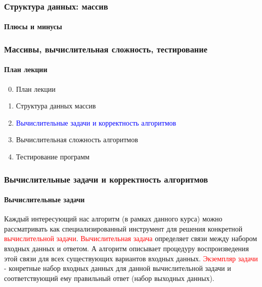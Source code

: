 \documentclass[aspectratio=169]{beamer}
\begin{document}
\begin{frame}
\frametitle{Структура данных: массив}
\framesubtitle{Плюсы и минусы}
\justifying
\small

\begin{figure}
    \captionsetup[subfigure]{labelformat=empty}
    \centering
\end{figure}
\end{frame}

\begin{frame}
\frametitle{Массивы, вычислительная сложность, тестирование}
\framesubtitle{План лекции}

\begin{enumerate}
  \setcounter{enumi}{-1}
  \item{План лекции}
  \item{Структура данных массив}
  \item{\textcolor{blue}{Вычислительные задачи и корректность алгоритмов}}
  \item{Вычислительная сложность алгоритмов}
  \item{Тестирование программ}
\end{enumerate}
\end{frame}

\begin{frame}
\frametitle{Вычислительные задачи и корректность алгоритмов}
\framesubtitle{Вычислительные задачи}
\justifying

Каждый интересующий нас алгоритм (в рамках данного курса) можно рассматривать как специализированный инструмент для решения конкретной \textcolor{red}{вычислительной задачи}.\newline\newline
\textcolor{red}{Вычислительная задача} определяет связи между набором входных данных и ответом. А алгоритм описывает процедуру воспроизведения этой связи для всех существующих вариантов входных данных.\newline\newline
\textcolor{red}{Экземпляр задачи} - конретные набор входных данных для данной вычислительной задачи и соответствующий ему правильный ответ (набор выходных данных).\newline\newline
\end{frame}
\end{document}
